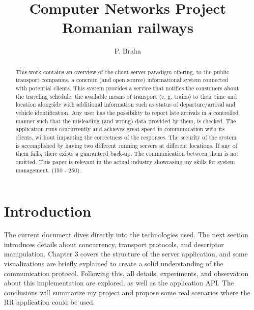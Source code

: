 \documentclass[runningheads]{llncs}
\begin{document}
\title{Computer Networks Project \\ Romanian railways}

\author{P. Braha}

\maketitle

\begin{abstract} This work contains an overview of the client-server paradigm offering, to the public transport companies, a concrete (and open source) informational system connected with potential clients. This system provides a service that notifies the consumers about the traveling schedule, the available means of transport (e. g. trains) to their time and location alongside with additional information such as status of departure/arrival and vehicle identification. Any user has the possibility to report late arrivals in a controlled manner such that the misleading (and wrong) data provided by them, is checked. The application runs concurrently and achieves great speed in communication with its clients, without impacting the correctness of the responses. The security of the system is accomplished by having two different running servers at different locations. If any of them fails, there exists a guaranteed back-up. The communication between them is not omitted. This paper is relevant in the actual industry showcasing my skills for system management. (150 - 250).

\end{abstract}


\section{Introduction}

The current document dives directly into the technologies used. The next section introduces details about concurrency, transport protocols, and descriptor manipulation. Chapter 3 covers the structure of the server application, and some visualizations are briefly explained to create a solid understanding of the communication protocol. Following this, all details, experiments, and observation about this implementation are explored, as well as the application API. The conclusions will summarize my project and propose some real scenarios where the RR application could be used.
\end{document}
